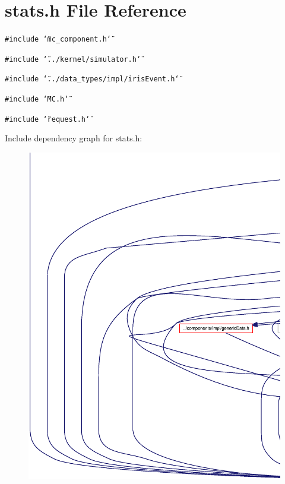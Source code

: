 \section{stats.h File Reference}
\label{stats_8h}
{\tt \#include \char`\"{}mc\_\-component.h\char`\"{}}\par
{\tt \#include \char`\"{}../kernel/simulator.h\char`\"{}}\par
{\tt \#include \char`\"{}../data\_\-types/impl/irisEvent.h\char`\"{}}\par
{\tt \#include \char`\"{}MC.h\char`\"{}}\par
{\tt \#include \char`\"{}request.h\char`\"{}}\par


Include dependency graph for stats.h:\nopagebreak
\begin{figure}[H]
\begin{center}
\leavevmode
\includegraphics[width=420pt]{stats_8h__incl}
\end{center}
\end{figure}


